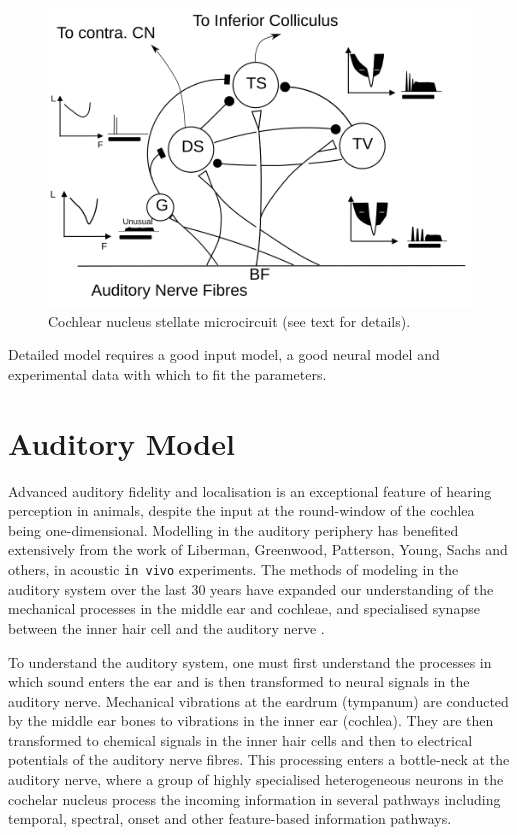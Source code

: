 \begin{figure}[htb]
  \centering
  \includegraphics[width=\textwidth]{gfx/CNcircuit}
  \caption{Cochlear nucleus stellate microcircuit (see text for details). }
  \label{fig:microcircuit}
\end{figure}


\medskip{}

Detailed model requires a good input model, a good neural model and
experimental data with which to fit the parameters.  

\section{Auditory Model}

Advanced auditory fidelity and localisation is an exceptional feature
of hearing perception in animals, despite the input at the
round-window of the cochlea being one-dimensional.  Modelling in the
auditory periphery has benefited extensively from the work of
Liberman, Greenwood, Patterson, Young, Sachs and others, in acoustic
\texttt{in vivo} experiments. The methods of modeling in the auditory
system over the last 30 years have expanded our understanding of the
mechanical processes in the middle ear and cochleae, and specialised
synapse between the inner hair cell and the auditory nerve
\citep{DavisVoigt:1991,Carney:1993,MeddisHewittEtAl:1990}.


To understand the auditory system, one must first understand the
processes in which sound enters the ear and is then transformed to
neural signals in the auditory nerve. Mechanical vibrations at the
eardrum (tympanum) are conducted by the middle ear bones to vibrations
in the inner ear (cochlea). They are then transformed to chemical
signals in the inner hair cells and then to electrical potentials of
the auditory nerve fibres. This processing enters a bottle-neck at the
auditory nerve, where a group of highly specialised heterogeneous
neurons in the cochelar nucleus process the incoming information in
several pathways including temporal, spectral, onset and
other feature-based information pathways.

